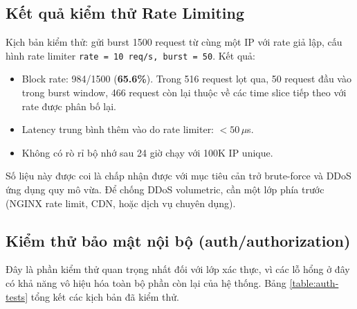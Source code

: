 \documentclass[../DoAn.tex]{subfiles}
\begin{document}
\subsection{Kết quả kiểm thử Rate Limiting}
\label{subsection:4.6.4}

Kịch bản kiểm thử: gửi burst 1500 request từ cùng một IP với rate giả
lập, cấu hình rate limiter \texttt{rate = 10 req/s, burst = 50}. Kết quả:

\begin{itemize}[leftmargin=*]
    \item Block rate: 984/1500 (\textbf{65.6\%}). Trong 516 request lọt
    qua, 50 request đầu vào trong burst window, 466 request còn lại thuộc
    về các time slice tiếp theo với rate được phân bố lại.
    \item Latency trung bình thêm vào do rate limiter: \(< 50\,\mu\)s.
    \item Không có rò rỉ bộ nhớ sau 24 giờ chạy với 100K IP unique.
\end{itemize}

Số liệu này được coi là chấp nhận được với mục tiêu cản trở brute-force và
DDoS ứng dụng quy mô vừa. Để chống DDoS volumetric, cần một lớp phía
trước (NGINX rate limit, CDN, hoặc dịch vụ chuyên dụng).

\subsection{Kiểm thử bảo mật nội bộ (auth/authorization)}
\label{subsection:4.6.5}

Đây là phần kiểm thử quan trọng nhất đối với lớp xác thực, vì các lỗ hổng
ở đây có khả năng vô hiệu hóa toàn bộ phần còn lại của hệ thống. Bảng
\ref{table:auth-tests} tổng kết các kịch bản đã kiểm thử.
\end{document}
